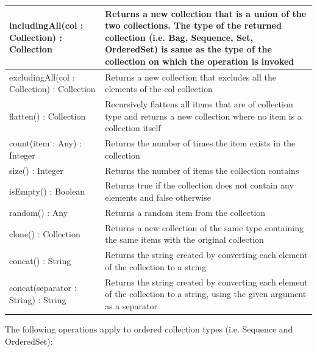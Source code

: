 \begin{longtable} {|p{5.5cm}|p{6.5cm}|}
			includingAll(col : Collection) : Collection & Returns a new collection that is a union of the two collections. The type of the returned collection (i.e. Bag, Sequence, Set, OrderedSet) is same as the type of the collection on which the operation is invoked \\\hline
			
			excludingAll(col : Collection) : Collection & Returns a new collection that excludes all the elements of the col collection \\\hline
			
			flatten() : Collection & Recursively flattens all items that are of collection type and returns a new collection where no item is a collection itself \\\hline
			
			count(item : Any) : Integer & Returns the number of times the item exists in the collection \\\hline
			
			size() : Integer & Returns the number of items the collection contains \\\hline
			
			isEmpty() : Boolean & Returns true if the collection does not contain any elements and false otherwise \\\hline
	
			random() : Any & Returns a random item from the collection \\\hline
			
			clone() : Collection & Returns a new collection of the same type containing the same items with the original collection \\\hline
			
			concat() : String & Returns the string created by converting each element of the collection to a string \\\hline
			
			concat(separator : String) : String & Returns the string created by converting each element of the collection to a string, using the given argument as a separator \\\hline
\end{longtable}

The following operations apply to ordered collection types (i.e. Sequence and OrderedSet):

